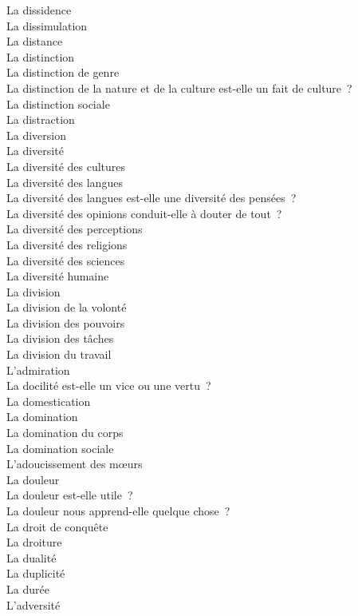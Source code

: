 \documentclass[a4paper,12pt]{article}
\begin{document}
La dissidence \\
La dissimulation \\
La distance \\
La distinction \\
La distinction de genre \\
La distinction de la nature et de la culture est-elle un fait de culture ? \\
La distinction sociale \\
La distraction \\
La diversion \\
La diversité \\
La diversité des cultures \\
La diversité des langues \\
La diversité des langues est-elle une diversité des pensées ? \\
La diversité des opinions conduit-elle à douter de tout ? \\
La diversité des perceptions \\
La diversité des religions \\
La diversité des sciences \\
La diversité humaine \\
La division \\
La division de la volonté \\
La division des pouvoirs \\
La division des tâches \\
La division du travail \\
L'admiration \\
La docilité est-elle un vice ou une vertu ? \\
La domestication \\
La domination \\
La domination du corps \\
La domination sociale \\
L'adoucissement des mœurs \\
La douleur \\
La douleur est-elle utile ? \\
La douleur nous apprend-elle quelque chose ? \\
La droit de conquête \\
La droiture \\
La dualité \\
La duplicité \\
La durée \\
L'adversité \\
\end{document}
